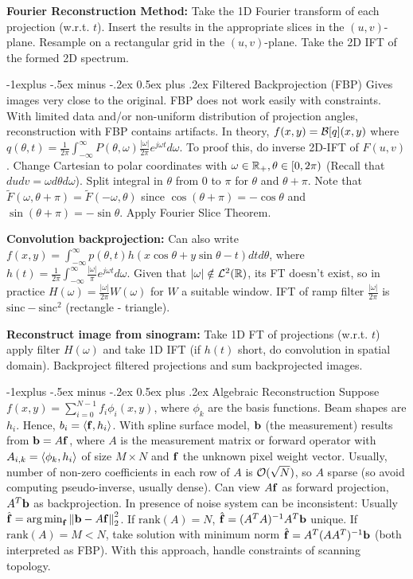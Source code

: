 \documentclass{article}
\makeatletter
\renewcommand{\subsection}{\@startsection{subsection}{2}{0mm}%
                                {-1explus -.5ex minus -.2ex}%
                                {0.5ex plus .2ex}%
                                {\color{red!50!yellow}\normalfont\small\bfseries}}
\makeatother
\begin{document}
\begin{multicols*}{3}
    \textbf{Fourier Reconstruction Method: }Take the 1D Fourier transform of each projection (w.r.t. $t$). Insert the results in the appropriate slices in the $(u, v )$-plane. Resample on a rectangular grid in the $(u, v )$-plane. Take the 2D IFT of the formed 2D spectrum.
    
    \subsection{Filtered Backprojection (FBP)}
    Gives images very close to the original. FBP does not work easily with constraints. With limited data and/or non-uniform distribution of projection angles, reconstruction with FBP contains artifacts. In theory, $f(x,y)=\mathcal{B}[q](x,y)$ where $q(\theta, t)=\frac{1}{2\pi}\int_{-\infty}^\infty P(\theta,\omega)\frac{|\omega|}{2\pi} e^{j\omega t}d\omega$. To proof this, do inverse 2D-IFT of $F(u,v)$. Change Cartesian to polar coordinates with $\omega\in\mathbb{R}_+,\theta\in [0,2\pi)$ (Recall that $dudv=\omega d\theta d\omega$). Split integral in $\theta$ from 0 to $\pi$ for $\theta$ and $\theta+\pi$. Note that $\tilde{F}(\omega,\theta+\pi)=\tilde{F}(-\omega,\theta)$ since $\cos(\theta+\pi)=-\cos\theta$ and $\sin(\theta+\pi)=-\sin\theta$. Apply Fourier Slice Theorem.
    
    \textbf{Convolution backprojection: }Can also write $f(x,y)=\int_{-\infty}^\infty p(\theta,t)h(x\cos\theta+y\sin\theta-t)dtd\theta$, where $h(t)=\frac{1}{2\pi}\int_{-\infty}^\infty \frac{|\omega|}{\pi}e^{j\omega t}d\omega$. Given that $|\omega|\notin \mathcal{L}^2(\mathbb{R})$, its FT doesn't exist, so in practice $H(\omega)=\frac{|\omega|}{2\pi}W(\omega)$ for $W$ a suitable window. IFT of ramp filter $\frac{|\omega|}{2\pi}$ is $\text{sinc}-\text{sinc}^2$ (rectangle - triangle).
    
    \textbf{Reconstruct image from sinogram: }Take 1D FT of projections (w.r.t. $t$) apply filter $H(\omega)$ and take 1D IFT (if $h(t)$ short, do convolution in spatial domain). Backproject filtered projections and sum backprojected images.
    
    \subsection{Algebraic Reconstruction}
    Suppose $f(x,y)=\sum_{i=0}^{N-1}f_i\phi_i(x,y)$, where $\phi_k$ are the basis functions. Beam shapes are $h_i$. Hence, $b_i=\left\langle \mathbf{f},h_i \right\rangle$. With spline surface model, $\mathbf{b}$ (the measurement) results from $\mathbf{b}=A\mathbf{f}$, where $A$ is the measurement matrix or forward operator with $A_{i,k}=\left\langle \phi_k,h_i \right\rangle$ of size $M\times N$ and $\mathbf{f}$ the unknown pixel weight vector. Usually, number of non-zero coefficients in each row of $A$ is $\mathcal{O}(\sqrt{N})$, so $A$ sparse (so avoid computing pseudo-inverse, usually dense). Can view $A\mathbf{f}$ as forward projection, $A^T\mathbf{b}$ as backprojection. In presence of noise system can be inconsistent: Usually $\hat{\mathbf{f}}=\operatorname*{arg\,min}_{\mathbf{f}} \left\lVert\mathbf{b}-A\mathbf{f}\right\rVert_2^2$. If $\text{rank}(A)=N$, $\hat{\mathbf{f}}=(A^T A)^{-1}A^T\mathbf{b}$ unique. If $\text{rank}(A)=M<N$, take solution with minimum norm $\hat{\mathbf{f}}=A^T(A A^T)^{-1}\mathbf{b}$ (both interpreted as FBP). With this approach, handle constraints of scanning topology.
    

\end{multicols*}
\end{document}
